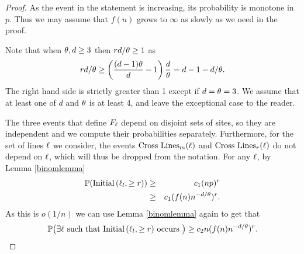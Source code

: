 
\begin{proof}
As the event in the statement is increasing, its probability is monotone in $p$. Thus we may 
assume that $f(n)$ grows to $\infty$ as slowly as we need in the proof. 

Note that when $\theta, d \geq 3$ then $r d/\theta \geq 1$ as
$$r d/\theta \geq \left( \frac{(d-1)\theta}{d} -1\right) \frac{d}{\theta} = d-1- d/\theta.$$  
The right hand side is strictly 
greater than 1 except if $d=\theta=3$. We assume that at least one of $d$ and $\theta$ 
is at least 4, and leave the exceptional case to the reader. 

The three events that define $F_\ell$ depend on disjoint sets of sites, so they are independent
and we compute their probabilities separately. 
Furthermore, for the set of lines $\ell$ we consider, the events 
$\hbox{Cross Lines}_m(\ell)$ and $\hbox{Cross Lines}_r(\ell)$ do not depend on $\ell$, which will thus be dropped from 
the notation.
For any $\ell$, by Lemma \ref{binomlemma}
\begin{eqnarray*}
\mathbb{P}(\hbox{Initial}\left(\ell_l, \geq r\right))
 &\geq& c_1  (np)^{r}\\
 &\geq& c_1  (f(n)n^{-d/\theta})^{r}.
\end{eqnarray*}
As this is $o(1/n)$ we can use Lemma \ref{binomlemma} again to get that
$$\mathbb{P}\big(\text{$\exists \ell$ such that $\hbox{Initial}\left(\ell_l, \geq r\right)$ occurs } \big) \geq  c_2  n (f(n)n^{-d/\theta})^{r}.$$
%
%
\begin{comment}
\begin{eqnarray*}
\prob(\I{\Ln_l}{\noodle})
 &\geq&  {n/3 \choose \noodle}p^{\noodle}(1-p)^{n/3-\noodle}\\
 &\geq& c_1  (np)^{\noodle}\\
 &\geq& c_1  (f(n)n^{-d/\threshold})^{\noodle}.
\end{eqnarray*}
Provided that $f(n)$ does not grow too quickly the right hand side is much smaller than $1/n$ so we get
$$\prob\left(\text{$\exists \Ln$ such that $\I{\Ln_l}{\noodle}$ occurs}\right) \geq  .5 c_1  n (f(n)n^{-d/\threshold})^{\noodle}.$$
\end{comment}


\end{proof}
